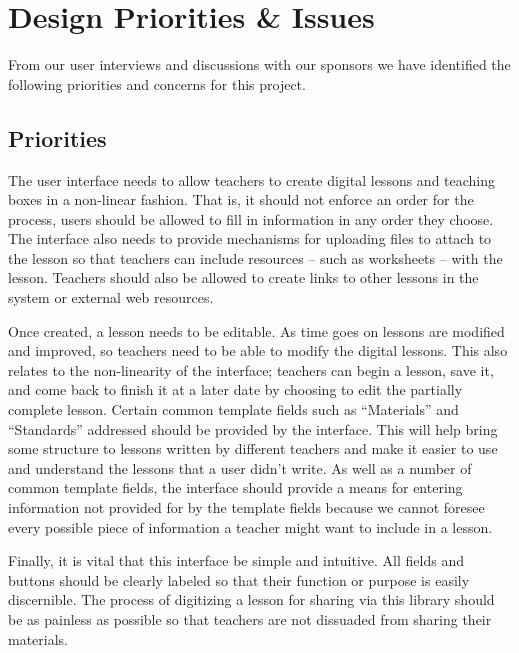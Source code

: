 \documentclass[10pt,letter]{article}
\begin{document}
\section{Design Priorities \& Issues}
From our user interviews and discussions with our sponsors we have identified
the following priorities and concerns for this project.

\subsection{Priorities}
The user interface needs to allow teachers to create digital lessons and
teaching boxes in a non-linear fashion. That is, it should not enforce an order
for the process, users should be allowed to fill in information in any order
they choose. The interface also needs to provide mechanisms for uploading files
to attach to the lesson so that teachers can include resources -- such as
worksheets -- with the lesson. Teachers should also be allowed to create links
to other lessons in the system or external web resources.

Once created, a lesson needs to be editable. As time goes on lessons are
modified and improved, so teachers need to be able to modify the digital
lessons. This also relates to the non-linearity of the interface; teachers can
begin a lesson, save it, and come back to finish it at a later date by choosing
to edit the partially complete lesson. Certain common template fields such as
``Materials'' and ``Standards'' addressed should be provided by the interface.
This will help bring some structure to lessons written by different teachers and
make it easier to use and understand the lessons that a user didn't write. As
well as a number of common template fields, the interface should provide a means
for entering information not provided for by the template fields because we
cannot foresee every possible piece of information a teacher might want to
include in a lesson.

Finally, it is vital that this interface be simple and intuitive. All fields and
buttons should be clearly labeled so that their function or purpose is easily
discernible. The process of digitizing a lesson for sharing via this library
should be as painless as possible so that teachers are not dissuaded from
sharing their materials.
\end{document}
